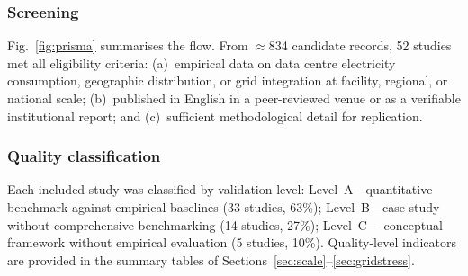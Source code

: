 \documentclass[preprint,12pt]{elsarticle}
\begin{document}
\subsubsection{Screening}
Fig.~\ref{fig:prisma} summarises the flow. From $\approx$834 candidate
records, 52 studies met all eligibility criteria: (a)~empirical data on data
centre electricity consumption, geographic distribution, or grid integration
at facility, regional, or national scale; (b)~published in English in a
peer-reviewed venue or as a verifiable institutional report; and
(c)~sufficient methodological detail for replication.

\subsubsection{Quality classification}
\begin{sloppypar}
Each included study was classified by validation level: Level~A---quantitative
benchmark against empirical baselines (33 studies, 63\%); Level~B---case
study without comprehensive benchmarking (14 studies, 27\%); Level~C---
conceptual framework without empirical evaluation (5 studies, 10\%).
Quality-level indicators are provided in the summary tables of
Sections~\ref{sec:scale}--\ref{sec:gridstress}.
\end{sloppypar}
\end{document}
